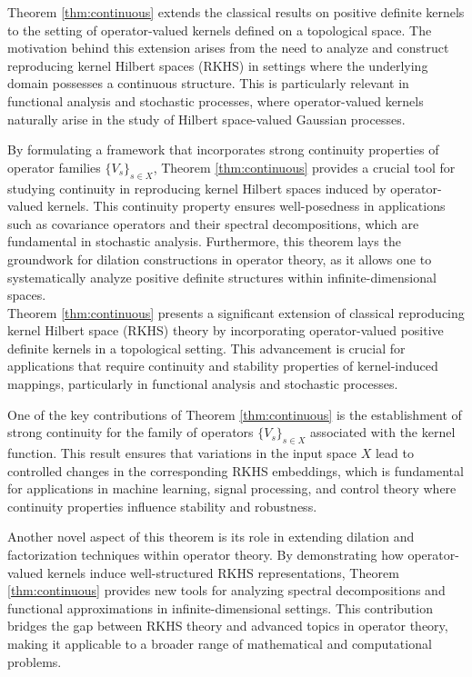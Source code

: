 \documentclass[11pt]{amsart}
\theoremstyle{definition}
\numberwithin{equation}{section}
\begin{document}
Theorem \ref{thm:continuous} extends the classical results on positive definite kernels to the setting of operator-valued kernels defined on a topological space. The motivation behind this extension arises from the need to analyze and construct reproducing kernel Hilbert spaces (RKHS) in settings where the underlying domain possesses a continuous structure. This is particularly relevant in functional analysis and stochastic processes, where operator-valued kernels naturally arise in the study of Hilbert space-valued Gaussian processes. 

By formulating a framework that incorporates strong continuity properties of operator families $\{V_s\}_{s \in X}$, Theorem \ref{thm:continuous} provides a crucial tool for studying continuity in reproducing kernel Hilbert spaces induced by operator-valued kernels. This continuity property ensures well-posedness in applications such as covariance operators and their spectral decompositions, which are fundamental in stochastic analysis. Furthermore, this theorem lays the groundwork for dilation constructions in operator theory, as it allows one to systematically analyze positive definite structures within infinite-dimensional spaces.\\

\noindent
Theorem \ref{thm:continuous} presents a significant extension of classical reproducing kernel Hilbert space (RKHS) theory by incorporating operator-valued positive definite kernels in a topological setting. This advancement is crucial for applications that require continuity and stability properties of kernel-induced mappings, particularly in functional analysis and stochastic processes.

One of the key contributions of Theorem \ref{thm:continuous} is the establishment of strong continuity for the family of operators $\{V_s\}_{s \in X}$ associated with the kernel function. This result ensures that variations in the input space $X$ lead to controlled changes in the corresponding RKHS embeddings, which is fundamental for applications in machine learning, signal processing, and control theory where continuity properties influence stability and robustness.

Another novel aspect of this theorem is its role in extending dilation and factorization techniques within operator theory. By demonstrating how operator-valued kernels induce well-structured RKHS representations, Theorem \ref{thm:continuous} provides new tools for analyzing spectral decompositions and functional approximations in infinite-dimensional settings. This contribution bridges the gap between RKHS theory and advanced topics in operator theory, making it applicable to a broader range of mathematical and computational problems.
\end{document}

